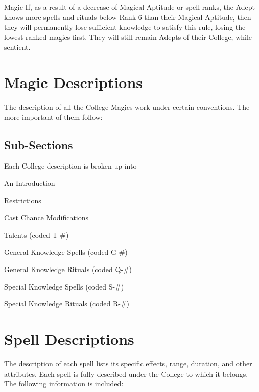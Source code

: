 \begin{Chapter}{Magic}
If, as a result of a decrease of Magical Aptitude or spell ranks, the
Adept knows more spells and rituals below Rank 6 than their Magical
Aptitude, then they will permanently lose sufficient knowledge to
satisfy this rule, losing the lowest ranked magics first. They will
still remain Adepts of their College, while sentient.


\section{Magic Descriptions}

The description of all the College Magics work under certain
conventions.  The more important of them follow:

\subsection{Sub-Sections}

Each College description is broken up into  

\begin{Itemize}
  
\item An Introduction  

\item Restrictions  

\item Cast Chance Modifications  

\item Talents (coded T-\#)  

\item General Knowledge Spells (coded G-\#)  

\item General Knowledge Rituals (coded Q-\#)  

\item Special Knowledge Spells (coded S-\#)  

\item Special Knowledge Rituals (coded R-\#) 

\end{Itemize}


\section{Spell Descriptions}

The description of each spell lists its specific effects, range,
duration, and other attributes.  Each spell is fully described under
the College to which it belongs. The following information is
included:


\end{Chapter}
